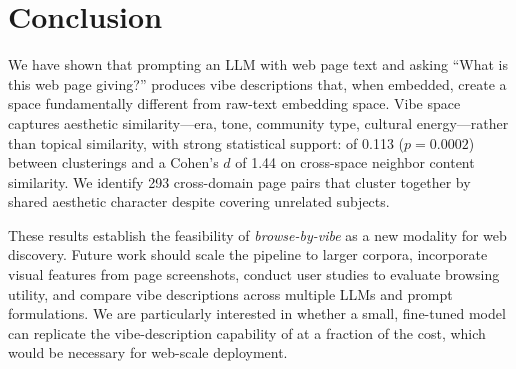 \section{Conclusion}
\label{sec:conclusion}

We have shown that prompting an LLM with web page text and asking ``What is this web page giving?'' produces vibe descriptions that, when embedded, create a space fundamentally different from raw-text embedding space.
Vibe space captures aesthetic similarity---era, tone, community type, cultural energy---rather than topical similarity, with strong statistical support: \ari of 0.113 ($p{=}0.0002$) between clusterings and a Cohen's $d$ of 1.44 on cross-space neighbor content similarity.
We identify 293 cross-domain page pairs that cluster together by shared aesthetic character despite covering unrelated subjects.

These results establish the feasibility of \emph{browse-by-vibe} as a new modality for web discovery.
Future work should scale the pipeline to larger corpora, incorporate visual features from page screenshots, conduct user studies to evaluate browsing utility, and compare vibe descriptions across multiple LLMs and prompt formulations.
We are particularly interested in whether a small, fine-tuned model can replicate the vibe-description capability of \gptfour at a fraction of the cost, which would be necessary for web-scale deployment.
